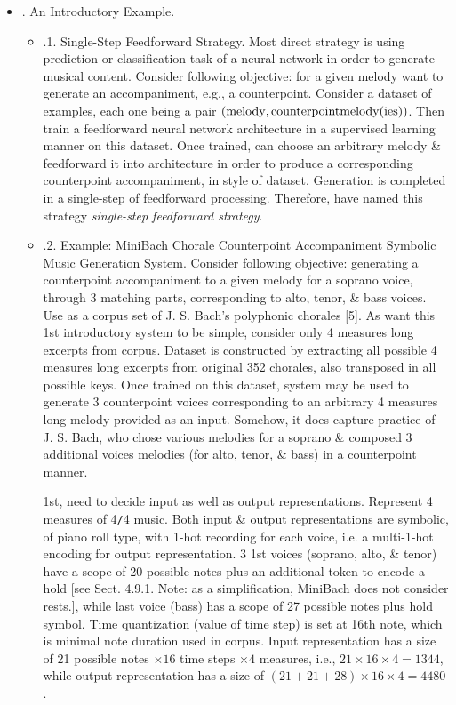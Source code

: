 \documentclass{article}
\begin{document}
\begin{itemize}
\begin{itemize}
		\item {. An Introductory Example.}
		\begin{itemize}
			\item {.1. Single-Step Feedforward Strategy.} Most direct strategy is using prediction or classification task of a neural network in order to generate musical content. Consider following objective: for a given melody want to generate an accompaniment, e.g., a counterpoint. Consider a dataset of examples, each one being a pair $({\rm melody},{\rm counterpointmelody}({\rm ies}))$. Then train a feedforward neural network architecture in a supervised learning manner on this dataset. Once trained, can choose an arbitrary melody \& feedforward it into architecture in order to produce a corresponding counterpoint accompaniment, in style of dataset. Generation is completed in a single-step of feedforward processing. Therefore, have named this strategy {\it single-step feedforward strategy}.
			\item {.2. Example: MiniBach Chorale Counterpoint Accompaniment Symbolic Music Generation System.} Consider following objective: generating a counterpoint accompaniment to a given melody for a soprano voice, through 3 matching parts, corresponding to alto, tenor, \& bass voices. Use as a corpus set of {\sc J. S. Bach}'s polyphonic chorales [5]. As want this 1st introductory system to be simple, consider only 4 measures long excerpts from corpus. Dataset is constructed by extracting all possible 4 measures long excerpts from original 352 chorales, also transposed in all possible keys. Once trained on this dataset, system may be used to generate 3 counterpoint voices corresponding to an arbitrary 4 measures long melody provided as an input. Somehow, it does capture practice of {\sc J. S. Bach}, who chose various melodies for a soprano \& composed 3 additional voices melodies (for alto, tenor, \& bass) in a counterpoint manner.
			
			1st, need to decide input as well as output representations. Represent 4 measures of 4{\tt/}4 music. Both input \& output representations are symbolic, of piano roll type, with 1-hot recording for each voice, i.e. a multi-1-hot encoding for output representation. 3 1st voices (soprano, alto, \& tenor) have a scope of 20 possible notes plus an additional token to encode a hold [see Sect. 4.9.1. Note: as a simplification, MiniBach does not consider rests.], while last voice (bass) has a scope of 27 possible notes plus hold symbol. Time quantization (value of time step) is set at 16th note, which is minimal note duration used in corpus. Input representation has a size of 21 possible notes $\times16$ time steps $\times4$ measures, i.e., $21\times16\times4 = 1344$, while output representation has a size of $(21 + 21 + 28)\times16\times4 = 4480$.
			

\end{itemize}
\end{itemize}
\end{itemize}
\end{document}
